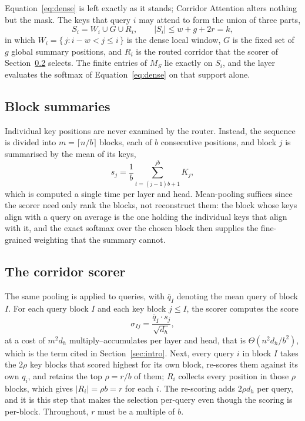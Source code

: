 \documentclass[11pt]{article}
\begin{document}
Equation~\eqref{eq:dense} is left exactly as it stands; Corridor Attention
alters nothing but the mask. The keys that query $i$ may attend to form the
union of three parts,
\begin{equation}\label{eq:support}
  S_i = W_i \cup G \cup R_i, \qquad |S_i| \le w + g + 2r = k,
\end{equation}
in which $W_i = \{\, j : i - w < j \le i \,\}$ is the dense local window,
$G$ is the fixed set of $g$ global summary positions, and $R_i$ is the
routed corridor that the scorer of Section~\ref{sec:scorer} selects. The
finite entries of $M_S$ lie exactly on $S_i$, and the layer evaluates the
softmax of Equation~\eqref{eq:dense} on that support alone.

\subsection{Block summaries}\label{sec:summaries}

Individual key positions are never examined by the router. Instead, the
sequence is divided into $m = \lceil n/b \rceil$ blocks, each of $b$
consecutive positions, and block $j$ is summarised by the mean of its keys,
\begin{equation}\label{eq:summary}
  s_j = \frac{1}{b} \sum_{t=(j-1)b+1}^{jb} K_j ,
\end{equation}
which is computed a single time per layer and head. Mean-pooling suffices
since the scorer need only rank the blocks, not reconstruct them: the block
whose keys align with a query on average is the one holding the individual
keys that align with it, and the exact softmax over the chosen block then
supplies the fine-grained weighting that the summary cannot.

\subsection{The corridor scorer}\label{sec:scorer}

The same pooling is applied to queries, with $\bar{q}_I$ denoting the mean
query of block $I$. For each query block $I$ and each key block $j \le I$,
the scorer computes the score
\begin{equation}\label{eq:score}
  \sigma_{Ij} = \frac{\bar{q}_I \cdot s_j}{\sqrt{d_h}} ,
\end{equation}
at a cost of $m^2 d_h$ multiply--accumulates per layer and head, that is
$\Theta(n^2 d_h / b^2)$, which is the term cited in Section~\ref{sec:intro}.
Next, every query $i$ in block $I$ takes the $2\rho$ key blocks that scored
highest for its own block, re-scores them against its own $q_i$, and retains
the top $\rho = r/b$ of them; $R_i$ collects every position in those $\rho$
blocks, which gives $|R_i| = \rho b = r$ for each $i$. The re-scoring adds
$2\rho d_h$ per query, and it is this step that makes the selection
per-query even though the scoring is per-block. Throughout, $r$ must be a
multiple of $b$.
\end{document}

